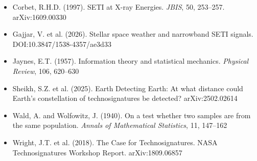 \documentclass[11pt]{article}
\theoremstyle{definition}
\begin{document}
\begin{itemize}[noitemsep]
\item Corbet, R.H.D. (1997). SETI at X-ray Energies. \emph{JBIS}, 50, 253--257. arXiv:1609.00330
\item Gajjar, V. et al. (2026). Stellar space weather and narrowband SETI signals. DOI:10.3847/1538-4357/ae3d33
\item Jaynes, E.T. (1957). Information theory and statistical mechanics. \emph{Physical Review}, 106, 620--630
\item Sheikh, S.Z. et al. (2025). Earth Detecting Earth: At what distance could Earth's constellation of technosignatures be detected? arXiv:2502.02614
\item Wald, A. and Wolfowitz, J. (1940). On a test whether two samples are from the same population. \emph{Annals of Mathematical Statistics}, 11, 147--162
\item Wright, J.T. et al. (2018). The Case for Technosignatures. NASA Technosignatures Workshop Report. arXiv:1809.06857
\end{itemize}
\end{document}
